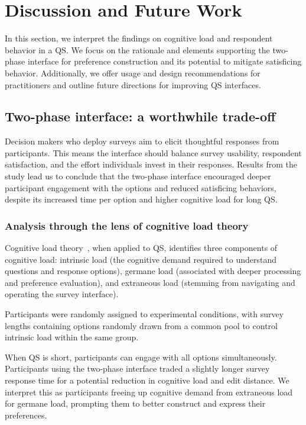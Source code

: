\section{Discussion and Future Work}
\label{sec:discussion}

In this section, we interpret the findings on cognitive load and respondent behavior in a QS. We focus on the rationale and elements supporting the two-phase interface for preference construction and its potential to mitigate satisficing behavior. Additionally, we offer usage and design recommendations for practitioners and outline future directions for improving QS interfaces.

\subsection{Two-phase interface: a worthwhile trade-off}
Decision makers who deploy surveys aim to elicit thoughtful responses from participants. This means the interface should balance survey usability, respondent satisfaction, and the effort individuals invest in their responses. Results from the study lead us to conclude that the two-phase interface encouraged deeper participant engagement with the options and reduced satisficing behaviors, despite its increased time per option and higher cognitive load for long QS.

\subsubsection{Analysis through the lens of cognitive load theory}
Cognitive load theory~\cite{swellerCognitiveLoadTheory2011}, when applied to QS, identifies three components of cognitive load: intrinsic load (the cognitive demand required to understand questions and response options), germane load (associated with deeper processing and preference evaluation), and extraneous load (stemming from navigating and operating the survey interface).

Participants were randomly assigned to experimental conditions, with survey lengths containing options randomly drawn from a common pool to control intrinsic load within the same group. 

When QS is short, participants can engage with all options simultaneously. Participants using the two-phase interface traded a slightly longer survey response time for a potential reduction in cognitive load and edit distance. We interpret this as participants freeing up cognitive demand from extraneous load for germane load, prompting them to better construct and express their preferences.

